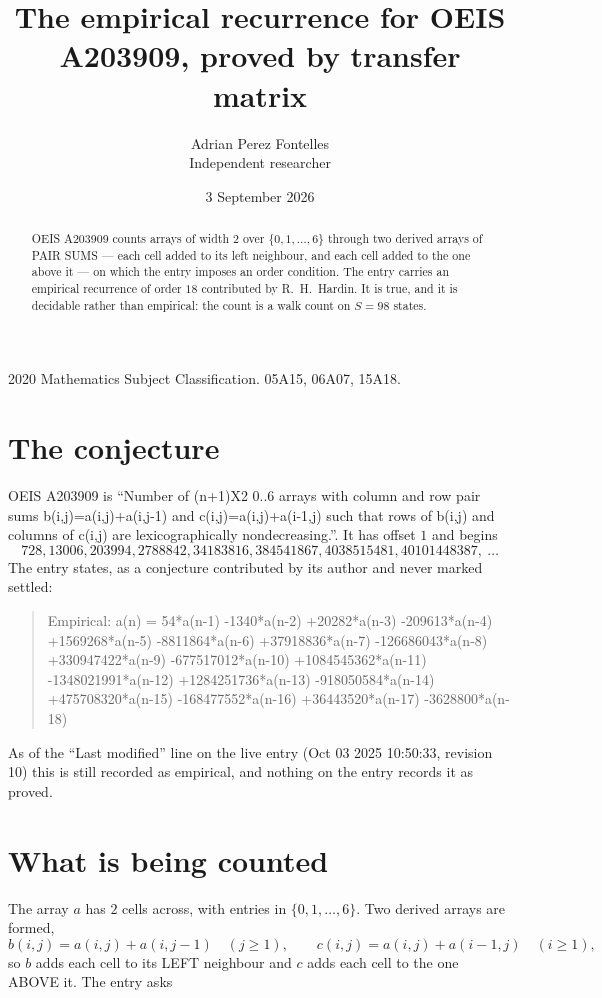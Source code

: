\documentclass[11pt,a4paper]{article}
\title{The empirical recurrence for OEIS A203909, proved by transfer matrix}
\author{Adrian Perez Fontelles\\ \small Independent researcher}
\date{3 September 2026}
\theoremstyle{plain}
\theoremstyle{definition}
\begin{document}
\maketitle

\begin{abstract}
OEIS A203909 counts arrays of width $2$ over $\{0,1,\dots,6\}$ through two derived arrays of PAIR SUMS ---
each cell added to its left neighbour, and each cell added to the one above it --- on which the
entry imposes an order condition. The entry carries an empirical recurrence of order $18$
contributed by R.~H.~Hardin. It is true, and it is decidable rather than empirical: the count is
a walk count on $S=98$ states.
\end{abstract}

\noindent\small 2020 Mathematics Subject Classification. 05A15, 06A07, 15A18.\normalsize

\section{The conjecture}

OEIS A203909 is ``Number of (n+1)X2 0..6 arrays with column and row pair sums b(i,j)=a(i,j)+a(i,j-1) and c(i,j)=a(i,j)+a(i-1,j) such that rows of b(i,j) and columns of c(i,j) are lexicographically nondecreasing.''. It has offset $1$ and begins
\[
728, 13006, 203994, 2788842, 34183816, 384541867, 4038515481, 40101448387,\ \dots
\]
The entry states, as a conjecture contributed by its author and never marked settled:
\begin{quote}
Empirical: a(n) = 54*a(n-1) -1340*a(n-2) +20282*a(n-3) -209613*a(n-4) +1569268*a(n-5) -8811864*a(n-6) +37918836*a(n-7) -126686043*a(n-8) +330947422*a(n-9) -677517012*a(n-10) +1084545362*a(n-11) -1348021991*a(n-12) +1284251736*a(n-13) -918050584*a(n-14) +475708320*a(n-15) -168477552*a(n-16) +36443520*a(n-17) -3628800*a(n-18)
\end{quote}
As of the ``Last modified'' line on the live entry (Oct 03 2025 10:50:33, revision 10) this is still
recorded as empirical, and nothing on the entry records it as proved.

\section{What is being counted}

The array $a$ has $2$ cells across, with entries in $\{0,1,\dots,6\}$. Two derived arrays are formed,
\[
b(i,j)=a(i,j)+a(i,j-1)\quad(j\ge1),\qquad c(i,j)=a(i,j)+a(i-1,j)\quad(i\ge1),
\]
so $b$ adds each cell to its LEFT neighbour and $c$ adds each cell to the one ABOVE it. The
entry asks
\end{document}
